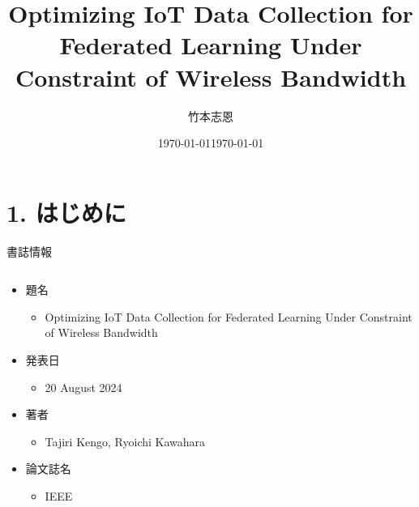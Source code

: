 \documentclass[unicode,12pt,aspectratio=169, dvipdfmx]{beamer}
\title{Optimizing IoT Data Collection for Federated Learning Under Constraint of Wireless Bandwidth}
\author{竹本志恩}
\date{\today}
\date[]{\today}
\institute{INIAD}
\begin{document}
    \frame{\maketitle}
    \section{1. はじめに}
    \begin{frame}{書誌情報}
        \begin{columns}
            \begin{column}{.8\linewidth}
                \begin{itemize}
                    \item 題名
                    \begin{itemize}
                        \item Optimizing IoT Data Collection for Federated Learning Under Constraint of Wireless Bandwidth
                    \end{itemize}
                    
                    \item 発表日
                    \begin{itemize}
                        \item 20 August 2024
                    \end{itemize}

                    \item 著者
                    \begin{itemize}
                        \item Tajiri Kengo, Ryoichi Kawahara
                    \end{itemize}

                    \item 論文誌名
                    \begin{itemize}
                        \item IEEE
                    \end{itemize}
                \end{itemize}          
            \end{column}
        \end{columns}
    \end{frame}
\end{document}

